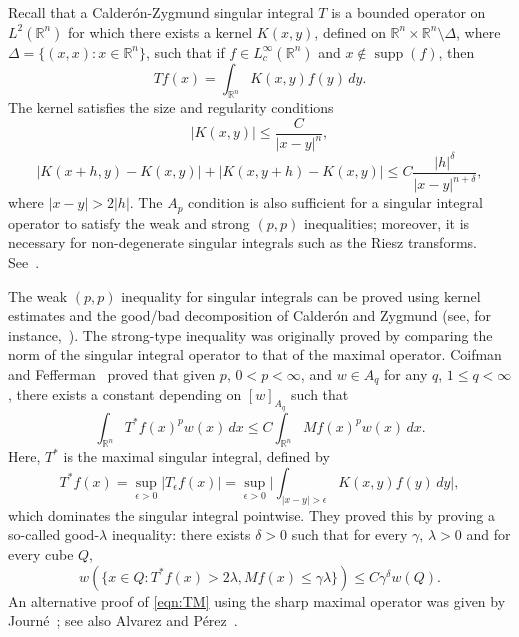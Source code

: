 \documentclass[12pt]{amsart}
\theoremstyle{definition}
\theoremstyle{remark}
\numberwithin{equation}{section}
\newcommand{\rn}{{{\mathbb R}^n}}
\DeclareMathOperator{\supp}{supp}
\begin{document}
  Recall that a Calder\'on-Zygmund singular integral $T$
is a bounded
operator on $L^2(\rn)$ for which there exists a kernel $K(x,y)$, defined on
$\rn\times \rn\setminus \Delta$, where $\Delta =\{ (x,x) : x \in \rn\}$, such that
if $f \in L_c^\infty(\rn)$ and $x\not\in \supp(f)$, then
%
\[ Tf(x) = \int_\rn K(x,y)f(y)\,dy.  \]
%
The kernel satisfies the size and regularity conditions
%
\[ |K(x,y)| \leq \frac{C}{|x-y|^n}, \]
%
\[ |K(x+h,y)-K(x,y)|+|K(x,y+h)-K(x,y)|
  \leq
  C\frac{|h|^\delta}{|x-y|^{n+\delta}}, \]
%
where $|x-y|>2|h|$.  The $A_p$ condition is also sufficient for a
singular integral operator to satisfy the weak and strong $(p,p)$
inequalities; moreover, it is necessary for non-degenerate singular
integrals such as the Riesz transforms.
See~\cite{duoandikoetxea01,garcia-cuerva-rubiodefrancia85,
  grafakos08b,stein93}.

The weak $(p,p)$ inequality for singular integrals can be proved using
kernel estimates and the good/bad decomposition of Calder\'on and
Zygmund (see, for instance,~\cite{garcia-cuerva-rubiodefrancia85}).
The strong-type inequality was originally proved by comparing the norm
of the singular integral operator to that of the maximal operator.
Coifman and Fefferman~\cite{coifman-fefferman74} proved that given
$p$, $0<p<\infty$, and $w\in A_q$ for any $q$, $1\leq q<\infty$, there
exists a constant depending on $[w]_{A_q}$ such that
%
\begin{equation} \label{eqn:TM}
\int_\rn T^*f(x)^p w(x)\,dx
  \leq
  C\int_\rn Mf(x)^p w(x)\,dx.  
\end{equation}
% 
Here, $T^*$ is the maximal singular integral, defined by
%
\[ T^* f(x) = \sup_{\epsilon>0}|T_\epsilon f(x)|
  = \sup_{\epsilon>0}
  \bigg|\int_{|x-y|>\epsilon} K(x,y)f(y)\,dy\bigg|, \]
%
which dominates the singular integral pointwise.  They proved this by
proving a so-called good-$\lambda$ inequality:  there exists
$\delta>0$ such that for every $\gamma,\,\lambda>0$ and for every cube $Q$,
%
\[ w(\{ x\in Q : T^*f(x) >2\lambda, Mf(x)\leq \gamma\lambda\})
  \leq
  C\gamma^\delta w(Q). \]
%
An alternative proof of \eqref{eqn:TM} using the sharp maximal
operator was given by
Journ\'e~\cite{MR706075}; see also Alvarez and
P\'erez~\cite{alvarez-perez94}.
\end{document}
